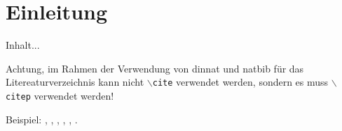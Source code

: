 \chapter{Einleitung}
\label{cha:einleitung}

Inhalt...

Achtung, im Rahmen der Verwendung von dinnat und natbib für das Litereaturverzeichnis kann nicht \texttt{$\backslash$cite} verwendet werden, sondern es muss \texttt{$\backslash$citep} verwendet werden!

Beispiel: \citep{Blank2008}, \citep{DeutscheNationalBibliothek2009}, \citep{Ehgartner2004}, \citep{Farkas2007}, \citep{Hatcher2004}, \citep{Henze2006}.
